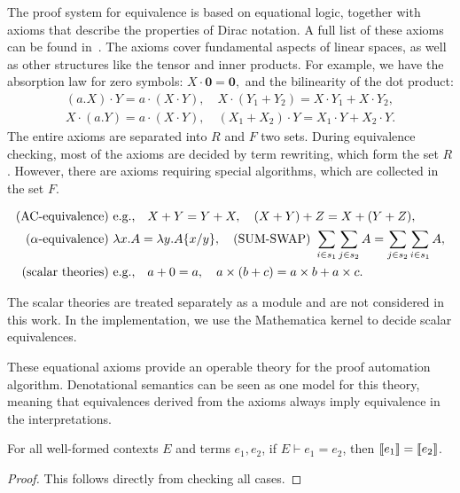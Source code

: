 The proof system for equivalence is based on equational logic, together with axioms that describe the properties of Dirac notation. A full list of these axioms can be found in~. The axioms cover fundamental aspects of linear spaces, as well as other structures like the tensor and inner products. For example, we have the absorption law for zero symbols:
\(X \cdot \mathbf{0} = \mathbf{0},\)
and the bilinearity of the dot product:
\begin{align*}
(a.X) \cdot Y = a \cdot (X \cdot Y), \quad X \cdot (Y_1 + Y_2) = X \cdot Y_1 + X \cdot Y_2, \\
X \cdot (a.Y) = a \cdot (X \cdot Y), \quad (X_1 + X_2) \cdot Y = X_1 \cdot Y + X_2 \cdot Y.
\end{align*}
The entire axioms are separated into $R$ and $F$ two sets.
During equivalence checking, most of the axioms are decided by term rewriting, which form the set $R$. However, there are axioms requiring special algorithms, which are collected in the set $F$.
\begin{definition}
\label{def: axiom F}
\begin{align*}
    \textup{(AC-equivalence)} &\ \text{e.g.,} \quad X + Y = Y + X, \quad (X + Y) + Z = X + (Y + Z), \\
    \textup{($\alpha$-equivalence)} &\ \lambda x . A = \lambda y . A\{x/y\},
    \quad
    \textup{(SUM-SWAP)} \ \sum_{i \in s_1} \sum_{j \in s_2} A = \sum_{j \in s_2} \sum_{i \in s_1} A, \\
    \textup{(scalar theories)} &\ \text{e.g.,} \quad a + 0 = a, \quad a \times (b + c) = a \times b + a \times c.
\end{align*}
\end{definition}

The scalar theories are treated separately as a module and are not considered in this work. In the implementation, we use the Mathematica kernel to decide scalar equivalences.

These equational axioms provide an operable theory for the proof automation algorithm. Denotational semantics can be seen as one model for this theory, meaning that equivalences derived from the axioms always imply equivalence in the interpretations.
\begin{lemma}
    \label{lem: axiom sound}
    For all well-formed contexts \( E \) and terms \( e_1, e_2 \), if \( E \vdash e_1 = e_2 \), then \( {\llbracket e_1 \rrbracket} = {\llbracket e_2 \rrbracket} \).
\end{lemma}
\begin{proof}
    This follows directly from checking all cases.
\end{proof}

